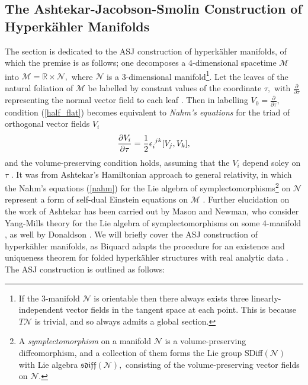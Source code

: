 \documentclass[a4paper,12pt, onecolumn, notitlepage]{article}
\theoremstyle{definition}
\theoremstyle{remark}
\newcommand{\e}{\epsilon}
\newcommand{\ddt}[1]{\frac{\partial #1}{\partial \tau}}
\newcommand{\dd}[2]{\frac{\partial #1}{\partial #2}}
\newcommand{\HK}{hyperk\"ahler }
\newcommand{\R}{\mathbb{R}}
\begin{document}
\subsection{The Ashtekar-Jacobson-Smolin Construction of Hyperk\"ahler Manifolds}
The section is dedicated to the ASJ construction of \HK manifolds, of which the premise is as follows; one decomposes a 4-dimensional spacetime $\mathcal{M}$ into $\mathcal{M}=\R\times \mathcal{N},$ where $\mathcal{N}$ is a 3-dimensional manifold\footnote{If the 3-manifold $\mathcal{N}$ is orientable then there always exists three linearly-independent vector fields in the tangent space at each point. This is because $T\mathcal{N}$ is trivial, and so always admits a global section.}. Let the leaves of the natural foliation of $\mathcal{M}$ be labelled by constant values of the coordinate $\tau,$ with $\ddt{}$ representing the normal vector field to each leaf \cite{donaldson}. Then in labelling $V_{0}=\ddt{},$ condition (\ref{half_flat}) becomes equivalent to \emph{Nahm's equations} for the triad of orthogonal vector fields $V_{i}$
\begin{equation}
\label{nahm}
\dd{V_{i}}{\tau} = \frac{1}{2}\e\indices{_i^j^k}[V_{j},V_{k}],
\end{equation}
and the volume-preserving condition holds, assuming that the $V_{i}$ depend soley on $\tau$ \cite{donaldson}. It was from Ashtekar's Hamiltonian approach to general relativity, in which the Nahm's equations (\ref{nahm}) for the Lie algebra of symplectomorphisms\footnote{A \emph{symplectomorphism} on a manifold $\mathcal{N}$ is a volume-preserving diffeomorphism, and a collection of them forms the Lie group SDiff$(\mathcal{N})$ with Lie algebra $\mathfrak{sdiff}(\mathcal{N}),$ consisting of the volume-preserving vector fields on $\mathcal{N}.$} on $\mathcal{N}$ represent a form of self-dual Einstein equations on $\mathcal{M}$ \cite{ashtekar_1987}. Further elucidation on the work of Ashtekar has been carried out by Mason and Newman, who consider Yang-Mills theory for the Lie algebra of symplectomorphisms on some 4-manifold \cite{mason_1989}, as well by Donaldson \cite{donaldson}. We will briefly cover the ASJ construction of \HK manifolds, as Biquard adapts the procedure for an existence and uniqueness theorem for folded \HK structures with real analytic data \cite{biquard_2015}.\\
The ASJ construction is outlined as follows:\\
\end{document}
